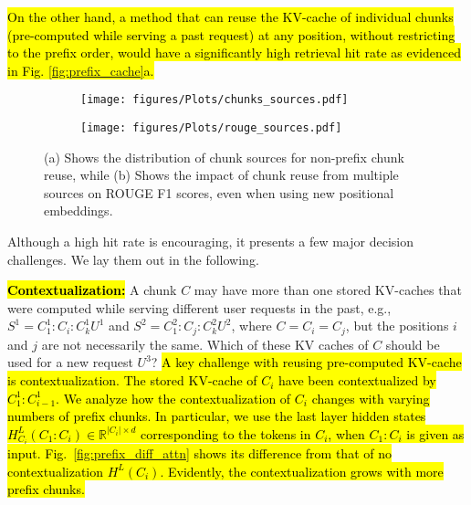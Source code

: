 \hl{On the other hand, a method that can reuse the KV-cache of individual chunks (pre-computed while serving a past request) at any position, without restricting to the prefix order, would have a significantly high retrieval hit rate as evidenced in Fig. \ref{fig:prefix_cache}a.}




\begin{figure}[t]
    \centering
    \captionsetup[subfigure]{justification=centering}
    \begin{subfigure}[t]{0.48\linewidth}
        \centering
        \texttt{[image: figures/Plots/chunks\_sources.pdf]}
        \caption{}
        \label{fig:chunk_sources}
    \end{subfigure}
    \hfill
    \begin{subfigure}[t]{0.48\linewidth}
        \centering
        \texttt{[image: figures/Plots/rouge\_sources.pdf]}
        \caption{}
        \label{fig:motiv_shuffle}
    \end{subfigure}
    \caption{(a) Shows the distribution of chunk sources for non-prefix chunk reuse, while (b) Shows the impact of chunk reuse from multiple sources on ROUGE F1 scores, even when using new positional embeddings.}
    \label{fig:combined_plots}
\end{figure}

Although a high hit rate is encouraging, it presents a few major decision challenges. We lay them out in the following.


\hl{\textbf{Contextualization:}}
A chunk $C$ may have more than one stored KV-caches that were computed while serving different user requests in the past, e.g., $S^1=C_1^1\!:\!C_i\!:\!C_k^1U^1$ and $S^2=C_1^2\!:\!C_j\!:\!C_k^2U^2$, where $C=C_i=C_j$, but the positions $i$ and $j$ are not necessarily the same. Which of these KV caches of $C$ should be used for a new request $U^3$? 
\hl{A key challenge with reusing pre-computed KV-cache is contextualization. 
The stored KV-cache of $C_{i}$ have been contextualized by $C_1^1\!:\!C_{i-1}^1$. We analyze how the contextualization of $C_{i}$ changes with varying numbers of prefix chunks. In particular, we use the last layer hidden states $H^L_{C_i}(C_1\!:\!C_i) \in \mathbb{R}^{|C_i|\times d}$ corresponding to the tokens in $C_i$, when $C_1\!:\!C_i$ is given as input. Fig.~\ref{fig:prefix_diff_attn} shows its difference from that of no contextualization $H^L(C_i)$. Evidently, the contextualization grows with more prefix chunks.}

